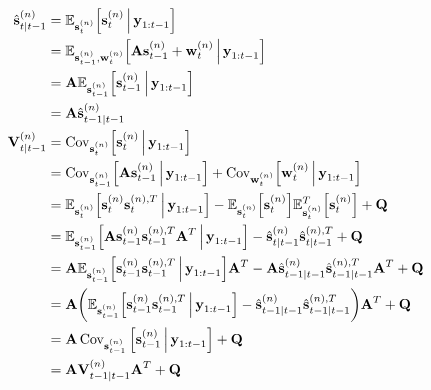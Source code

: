 			\begin{align*}
				\hat{\vec{s}}_{t \subgiven t - 1}^{(n)}
					&= \E_{\vec{s}_t^{(n)}}\Big[\vec{s}_t^{(n)} \Biggiven \vec{y}_{1:t - 1}\Big] \\
					&= \E_{\vec{s}_{t - 1}^{(n)}, \vec{w}_t^{(n)}}\Big[\mat{A} \vec{s}_{t - 1}^{(n)} + \vec{w}_t^{(n)} \Biggiven \vec{y}_{1:t - 1}\Big] \\
					&= \mat{A} \E_{\vec{s}_{t - 1}^{(n)}}\Big[\vec{s}_{t - 1}^{(n)} \Biggiven \vec{y}_{1:t - 1}\Big] \\
					&= \mat{A} \hat{\vec{s}}_{t - 1 \subgiven t - 1}^{(n)} \\
					\mat{V}_{t \subgiven t - 1}^{(n)}
					&= \Cov_{\vec{s}_t^{(n)}}\!\Big[\vec{s}_t^{(n)} \Biggiven \vec{y}_{1:t - 1}\Big] \\
					&= \Cov_{\vec{s}_{t - 1}^{(n)}}\!\Big[\mat{A} \vec{s}_{t - 1}^{(n)} \Biggiven \vec{y}_{1:t - 1}\Big] + \Cov_{\vec{w}_t^{(n)}}\!\Big[\vec{w}_t^{(n)} \Biggiven \vec{y}_{1:t - 1}\Big] \\
					&= \E_{\vec{s}_t^{(n)}}\Big[ \vec{s}_t^{(n)} \vec{s}_t^{(n), T} \Biggiven \vec{y}_{1:t - 1} \Big] - \E_{\vec{s}_t^{(n)}}\Big[\vec{s}_t^{(n)}\Big] \E_{\vec{s}_t^{(n)}}^T\Big[\vec{s}_t^{(n)}\Big] + \mat{Q} \\
					&= \E_{\vec{s}_{t - 1}^{(n)}}\Big[ \mat{A} \vec{s}_{t - 1}^{(n)} \vec{s}_{t - 1}^{(n), T} \mat{A}^T \Biggiven \vec{y}_{1:t - 1} \Big] - \hat{\vec{s}}_{t \subgiven t - 1}^{(n)} \hat{\vec{s}}_{t \subgiven t - 1}^{(n), T} + \mat{Q} \\
					&= \mat{A} \E_{\vec{s}_{t - 1}^{(n)}}\Big[ \vec{s}_{t - 1}^{(n)} \vec{s}_{t - 1}^{(n), T} \Biggiven \vec{y}_{1:t - 1} \Big] \mat{A}^T - \mat{A} \hat{\vec{s}}_{t - 1 \subgiven t - 1}^{(n)} \hat{\vec{s}}_{t - 1\subgiven t - 1}^{(n), T} \mat{A}^T + \mat{Q} \\
					&= \mat{A} \bigg( \E_{\vec{s}_{t - 1}^{(n)}}\Big[ \vec{s}_{t - 1}^{(n)} \vec{s}_{t - 1}^{(n), T} \Biggiven \vec{y}_{1:t - 1} \Big] - \hat{\vec{s}}_{t - 1 \subgiven t - 1}^{(n)} \hat{\vec{s}}_{t - 1\subgiven t - 1}^{(n), T} \bigg) \mat{A}^T + \mat{Q} \\
					&= \mat{A} \Cov_{\vec{s}_{t - 1}^{(n)}}\Big[ \vec{s}_{t - 1}^{(n)} \Biggiven \vec{y}_{1:t - 1} \Big] + \mat{Q} \\
					&= \mat{A} \mat{V}_{t - 1 \subgiven t - 1}^{(n)} \mat{A}^T + \mat{Q}
			\end{align*}

